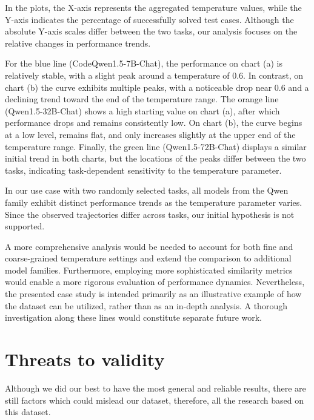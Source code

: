 In the plots, the X-axis represents the aggregated temperature values, while the Y-axis indicates the percentage of successfully solved test cases.
Although the absolute Y-axis scales differ between the two tasks, our analysis focuses on the relative changes in performance trends.

For the blue line (CodeQwen1.5-7B-Chat), the performance on chart (a) is relatively stable, with a slight peak around a temperature of 0.6.
In contrast, on chart (b) the curve exhibits multiple peaks, with a noticeable drop near 0.6 and a declining trend toward the end of the temperature range.
The orange line (Qwen1.5-32B-Chat) shows a high starting value on chart (a), after which performance drops and remains consistently low.
On chart (b), the curve begins at a low level, remains flat, and only increases slightly at the upper end of the temperature range.
Finally, the green line (Qwen1.5-72B-Chat) displays a similar initial trend in both charts, but the locations of the peaks differ between the two tasks, indicating task-dependent sensitivity to the temperature parameter.


\begin{framed}
	\noindent In our use case with two randomly selected tasks, all models from the Qwen family exhibit distinct performance trends as the temperature parameter varies.
		Since the observed trajectories differ across tasks, our initial hypothesis is not supported.
\end{framed}

A more comprehensive analysis would be needed to account for both fine and coarse-grained temperature settings and extend the comparison to additional model families.
Furthermore, employing more sophisticated similarity metrics would enable a more rigorous evaluation of performance dynamics.
Nevertheless, the presented case study is intended primarily as an illustrative example of how the dataset can be utilized, rather than as an in-depth analysis.
A thorough investigation along these lines would constitute separate future work.


\section{Threats to validity}
\label{th4:sec:threats_to_validity}

Although we did our best to have the most general and reliable results, there are still factors which could mislead our dataset, therefore, all the research based on this dataset.

